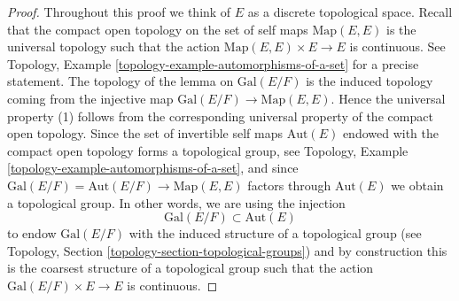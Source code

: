 \begin{proof}
Throughout this proof we think of $E$ as a discrete topological space.
Recall that the compact open topology on the set of self maps
$\text{Map}(E, E)$ is the universal topology such that the action
$\text{Map}(E, E) \times E \to E$ is continuous. See
Topology, Example \ref{topology-example-automorphisms-of-a-set}
for a precise statement. The topology of the lemma on
$\text{Gal}(E/F)$ is the induced topology coming from the
injective map $\text{Gal}(E/F) \to \text{Map}(E, E)$.
Hence the universal property (1) follows from the corresponding
universal property of the compact open topology.
Since the set of invertible self maps $\text{Aut}(E)$
endowed with the compact open topology forms a topological group, see
Topology, Example \ref{topology-example-automorphisms-of-a-set},
and since $\text{Gal}(E/F) = \text{Aut}(E/F) \to \text{Map}(E, E)$
factors through $\text{Aut}(E)$ we obtain a topological group.
In other words, we are using the injection
$$
\text{Gal}(E/F) \subset \text{Aut}(E)
$$
to endow $\text{Gal}(E/F)$ with the induced structure of a topological group
(see Topology, Section \ref{topology-section-topological-groups})
and by construction this is the coarsest structure of a topological
group such that the action $\text{Gal}(E/F) \times E \to E$ is continuous.


\end{proof}

